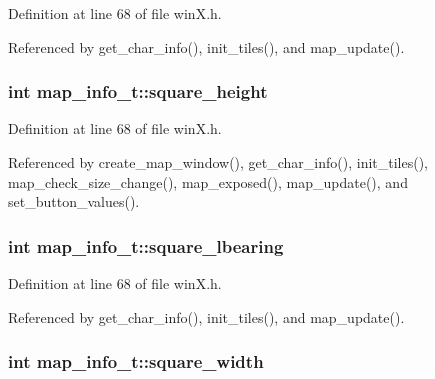 Definition at line 68 of file win\+X.\+h.



Referenced by get\+\_\+char\+\_\+info(), init\+\_\+tiles(), and map\+\_\+update().

\hypertarget{structmap__info__t_afa20d151bdcd5b1c5951fffcbf41888f}{
\subsubsection[{square\+\_\+height}]{\setlength{\rightskip}{0pt plus 5cm}int map\+\_\+info\+\_\+t\+::square\+\_\+height}}\label{structmap__info__t_afa20d151bdcd5b1c5951fffcbf41888f}


Definition at line 68 of file win\+X.\+h.



Referenced by create\+\_\+map\+\_\+window(), get\+\_\+char\+\_\+info(), init\+\_\+tiles(), map\+\_\+check\+\_\+size\+\_\+change(), map\+\_\+exposed(), map\+\_\+update(), and set\+\_\+button\+\_\+values().

\hypertarget{structmap__info__t_a6e4474b98d61592c9a57f3316d196d33}{
\subsubsection[{square\+\_\+lbearing}]{\setlength{\rightskip}{0pt plus 5cm}int map\+\_\+info\+\_\+t\+::square\+\_\+lbearing}}\label{structmap__info__t_a6e4474b98d61592c9a57f3316d196d33}


Definition at line 68 of file win\+X.\+h.



Referenced by get\+\_\+char\+\_\+info(), init\+\_\+tiles(), and map\+\_\+update().

\hypertarget{structmap__info__t_accdbb100815331534a3031f186eac852}{
\subsubsection[{square\+\_\+width}]{\setlength{\rightskip}{0pt plus 5cm}int map\+\_\+info\+\_\+t\+::square\+\_\+width}}\label{structmap__info__t_accdbb100815331534a3031f186eac852}



